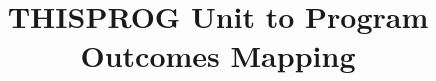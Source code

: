 \documentclass[ 
   paper = A3, 
   paper = landscape, 
   pagesize = auto 
   ]{scrbook}
\title{THISPROG Unit to Program Outcomes Mapping}
\begin{document}
\maketitle

\begin{scriptsize}

\end{scriptsize}
\end{document}
